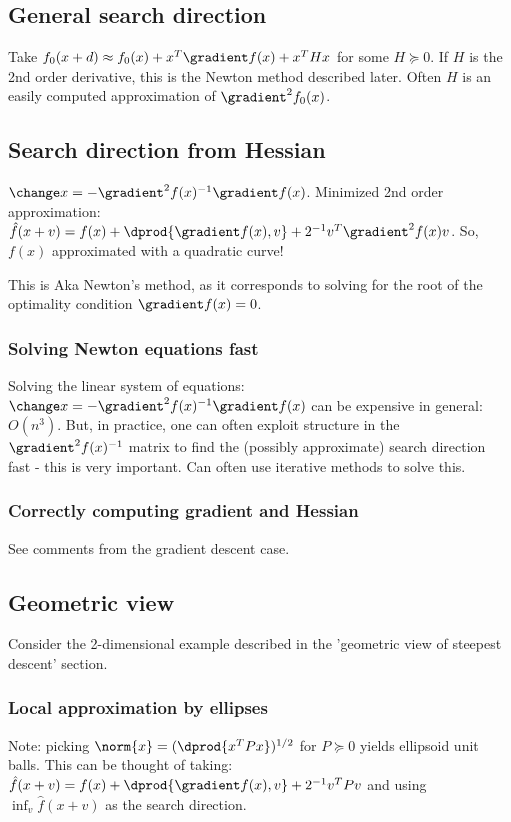 \documentclass[oneside, article]{memoir}
\begin{document}
\subsection{General search direction}
Take $f_0(x+d) \approx f_0(x) + x^{T}\gradient f(x) + x^{T}Hx$ for some $H \succeq 0$. If $H$ is the 2nd order derivative, this is the Newton method described later. Often $H$ is an easily computed approximation of $\gradient^{2}f_0(x)$.

\subsection{Search direction from Hessian}
$\change x = -\gradient^{2}f(x)^{-1} \gradient f(x) $. Minimized 2nd order approximation: $\hat{f}(x + v) = f(x) + \dprod{\gradient f(x), v} + 2^{-1} v^{T}\gradient^{2}f(x)v$. So, $f(x)$ approximated with a quadratic curve!

This is Aka Newton's method, as it corresponds to solving for the root of the optimality condition $\gradient f(x) = 0$.

\subsubsection{Solving Newton equations fast}
Solving the linear system of equations: $\change x = -\gradient^{2}f(x)^{-1} \gradient f(x) $ can be expensive in general: $O(n^{3})$. But, in practice, one can often exploit structure  in the $\gradient^{2}f(x)^{-1}$ matrix to find the (possibly approximate) search direction fast - this is very important. Can often use iterative methods to solve this.

\subsubsection{Correctly computing gradient and Hessian}
See comments from the gradient descent case.

\subsection{Geometric view}
Consider the 2-dimensional example described in the 'geometric view of steepest descent' section.

\subsubsection{Local approximation by ellipses}
Note: picking $\norm{x} = (\dprod{x^{T} Px})^{1/2}$ for $P \succeq 0$ yields ellipsoid unit balls. This can be thought of taking: $\hat{f}(x + v) = f(x) + \dprod{\gradient f(x), v} + 2^{-1} v^{T}Pv$ and using $\inf_v \hat{f}(x + v)$ as the search direction. 
\end{document}
